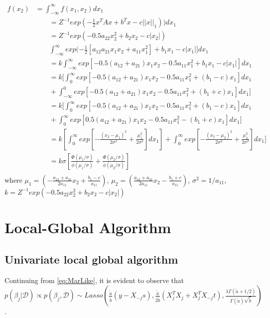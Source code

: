$$
\begin{array}{rl}
	f(x_2)
	& =  \int_{-\infty}^{\infty} f(x_1,x_2)dx_1 \\
	& \qquad
	= Z^{-1}exp(-\frac{1}{2}x^TAx + b^Tx - c||x||_1))dx_1 \\
	& \qquad
	= Z^{-1}exp(-0.5 a_{22}x_2^2 + b_2x_2 - c|x_2|) \\
	& \qquad
	\int_{-\infty}^{\infty}exp(-\frac{1}{2} [a_{12}a_{21}x_1x_2 + a_{11}x_1^2] + b_1x_1 - c|x_1|]dx_1\\
	& \qquad
	= k \int_{-\infty}^{\infty} exp[-0.5(a_{12}+a_{21})x_1x_2 -0.5a_{11}x_1^2 + b_1x_1 - c|x_1|]dx_1\\
	& \qquad
	= k[ \int_{0}^{\infty} exp[-0.5(a_{12}+a_{21})x_1x_2 - 0.5a_{11}x_1^2 + (b_1 - c)x_1 ]dx_1  \\
	& \qquad
	+\int_{-\infty}^{0} exp[-0.5(a_{12}+a_{21})x_1x_2  - 0.5a_{11}x_1^2  + (b_1 + c)x_1]dx_1 ]\\
	& \qquad
	= k[ \int_{0}^{\infty} exp[-0.5(a_{12}+a_{21})x_1x_2 - 0.5a_{11}x_1^2 + (b_1 - c)x_1 ]dx_1  \\
	& \qquad
	+\int_{0}^{\infty} exp[0.5(a_{12}+a_{21})x_1x_2  - 0.5a_{11}x_1^2  - (b_1+c)x_1]dx_1 ]\\
	& \qquad
	= k[\int_{0}^{\infty} exp[-\frac{(x_2-\mu_1)^2}{2\sigma^2} + \frac{\mu_1^2}{2\sigma^2}]dx_1] + \int_{0}^{\infty} exp[-\frac{(x_2-\mu_2)^2}{2\sigma^2} + \frac{\mu_2^2}{2\sigma^2}]dx_1] \\
	& \qquad
	= k \sigma[\frac{\Phi(\mu_1/\sigma)}{\phi(\mu_1/\sigma)} +
	\frac{\Phi(\mu_2/\sigma)}{\phi(\mu_2/\sigma)}]  \\
	
\end{array}
$$
where $\mu_1 = (-\frac{a_{12}+a_{21}}{2a_{11}}x_2 + \frac{b_1-c}{a_{11}}) $, $\mu_2 =(\frac{a_{12}+a_{21}}{2a_{11}}x_2 - \frac{b_1+c}{a_{11}}) $, $\sigma^2 = 1/a_{11}$, $k =  Z^{-1}exp(-0.5a_{22}x_2^2 + b_2x_2 - c|x_2|)$


\section{Local-Global Algorithm}
\subsection{Univariate local global algorithm}
Continuing from \autoref{eq:MarLike}, it is evident to observe that $p(\beta_j|\mathcal{D}) \propto p(\beta_j,\mathcal{D}) \sim Lasso(\frac{\tilde{a}}{\tilde{b}}(y - X_{-j}s), \frac{\tilde{a}}{2\tilde{b}}(X_j^TX_j+X_j^TX_{-j}t) , \frac{\lambda \Gamma(\tilde{a}+1/2)}{\Gamma(\tilde{a})\sqrt{\tilde{b}  }}) $.

